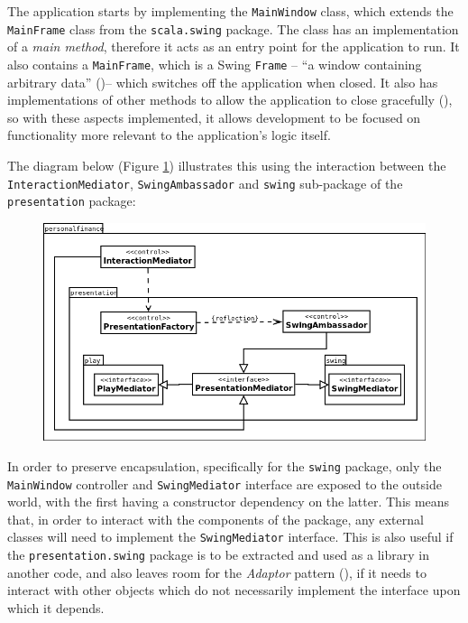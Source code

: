 \begin{sloppypar}
  The application starts by implementing the \texttt{MainWindow} class, which
  extends the \texttt{MainFrame} class from the \texttt{scala.swing} package.
  The class has an implementation of a \emph{main method}, therefore it acts as
  an entry point for the application to run. It also contains a
  \texttt{MainFrame}, which is a Swing \texttt{Frame} -- ``a window containing
  arbitrary data'' (\cite[][Ch.~34,~Section~34.1]{odersky2016scala})-- which
  switches off the application when closed. It also has implementations of
  other methods to allow the application to close gracefully
  (\cite[][p.~2~\&~3]{maier2009scala}), so with these aspects implemented, it
  allows development to be focused on functionality more relevant to the
  application's logic itself.
\end{sloppypar}


The diagram below
(Figure \ref{fig:PresentationMVC}) illustrates this using the interaction
between the \texttt{InteractionMediator}, \texttt{SwingAmbassador} and
\texttt{swing} sub-package of the \texttt{presentation} package:

\begin{figure}[ht!]
  \begin{center}
    \includegraphics[width=15cm]{contents/img/Package_Diagram_-_Presentation_MVC.png}
  \end{center}
  \caption{}
  \label{fig:PresentationMVC}
\end{figure}
\FloatBarrier


In order to preserve encapsulation, specifically for the \texttt{swing}
package, only the \texttt{MainWindow} controller and \texttt{SwingMediator}
interface are exposed to the outside world, with the first having a constructor
dependency on the latter. This means that, in order to interact with the
components of the package, any external classes will need to implement the
\texttt{SwingMediator} interface. This is also useful if the
\texttt{presentation.swing} package is to be extracted and used as a library in
another code, and also leaves room for the \emph{Adaptor} pattern
(\cite[][p.~139]{gamma1995design}), if it needs to interact with other objects which do not
necessarily implement the interface upon which it depends.

